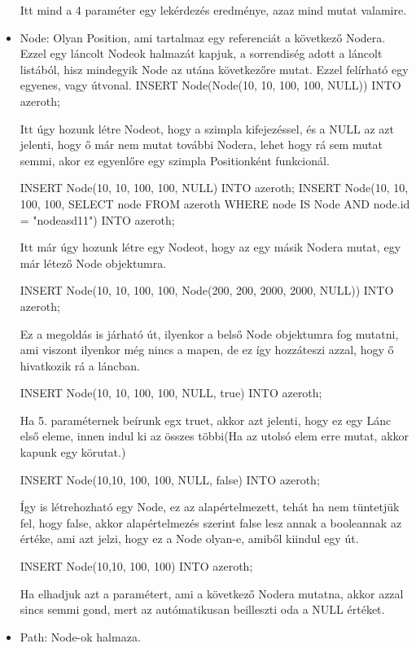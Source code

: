 \begin{itemize}
Itt mind a 4 paraméter egy lekérdezés eredménye, azaz mind mutat valamire.

\item Node: Olyan Position, ami tartalmaz egy referenciát a következő Nodera. Ezzel egy láncolt Nodeok halmazát kapjuk, a sorrendiség adott a láncolt listából, hisz mindegyik Node az utána következőre mutat. Ezzel felírható egy egyenes, vagy útvonal. 
INSERT Node(Node(10, 10, 100, 100, NULL)) INTO azeroth; 

Itt úgy hozunk létre Nodeot, hogy a szimpla kifejezéssel, és a NULL az azt jelenti, hogy ő már nem mutat további Nodera, lehet hogy rá sem mutat semmi, akor ez egyenlőre egy szimpla Positionként funkcionál.

\begin{sql}
INSERT Node(10, 10, 100, 100, NULL) INTO azeroth;
INSERT Node(10, 10, 100, 100, SELECT node FROM azeroth WHERE node IS Node AND node.id = "nodeasd11") INTO azeroth;
\end{sql}
Itt már úgy hozunk létre egy Nodeot, hogy az egy másik Nodera mutat, egy már létező Node objektumra.
\begin{sql}
INSERT Node(10, 10, 100, 100, Node(200, 200, 2000, 2000, NULL)) INTO azeroth;
\end{sql}
Ez a megoldás is járható út, ilyenkor a belső Node objektumra fog mutatni, ami viszont ilyenkor még nincs a mapen, de ez így hozzáteszi azzal, hogy ő hivatkozik rá a láncban.
\begin{sql}
INSERT Node(10, 10, 100, 100, NULL, true) INTO azeroth;
\end{sql}
Ha 5. paraméternek beírunk egx truet, akkor azt jelenti, hogy ez egy Lánc első eleme, innen indul ki az összes többi(Ha az utolsó elem erre mutat, akkor kapunk egy körutat.)
\begin{sql}
INSERT Node(10,10, 100, 100, NULL, false) INTO azeroth;
\end{sql}
Így is létrehozható egy Node, ez az alapértelmezett, tehát ha nem tüntetjük fel, hogy false, akkor alapértelmezés szerint false lesz annak a booleannak az értéke, ami azt jelzi, hogy ez a Node olyan-e, amiből kiindul egy út.
\begin{sql}
INSERT Node(10,10, 100, 100) INTO azeroth;
\end{sql}
Ha elhadjuk azt a paramétert, ami a következő Nodera mutatna, akkor azzal sincs semmi gond, mert az autómatikusan beilleszti oda a NULL értéket.

\item Path: Node-ok halmaza.


\end{itemize}
